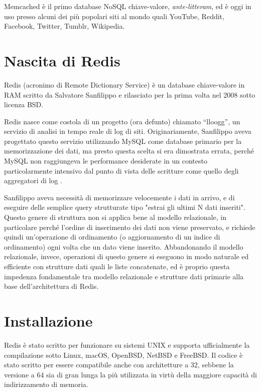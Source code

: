 Memcached è il primo database NoSQL chiave-valore, \emph{ante-litteram}, ed è oggi in uso presso alcuni
dei più popolari siti al mondo quali YouTube, Reddit, Facebook, Twitter, Tumblr, Wikipedia.


\section{Nascita di Redis}

Redis (acronimo di Remote Dictionary Service) è un database chiave-valore in RAM scritto
da Salvatore Sanfilippo e rilasciato per la prima volta nel 2008 sotto licenza BSD.

Redis nasce come costola di un progetto (ora defunto) chiamato ``lloogg'', un servizio di
analisi in tempo reale di log di siti. Originariamente, Sanfilippo aveva progettato
questo servizio utilizzando MySQL come database primario per la memorizzazione dei
dati, ma presto questa scelta si era dimostrata errata, perché MySQL non raggiungeva le
performance desiderate in un contesto particolarmente intensivo dal punto di vista delle
scritture come quello degli aggregatori di log \cite{nascita}.

Sanfilippo aveva necessità di memorizzare velocemente i dati in arrivo, e di eseguire
delle semplice query strutturate tipo "estrai gli ultimi N dati inseriti". Questo genere
di struttura non si applica bene al modello relazionale, in particolare perché l'ordine
di inserimento dei dati non viene preservato, e richiede quindi un'operazione di ordinamento
(o aggiornamento di un indice di ordinamento) ogni volta che un dato viene inserito.
Abbandonando il modello relazionale, invece, operazioni di questo genere si eseguono
in modo naturale ed efficiente con strutture dati quali le liste concatenate, ed è
proprio questa impedenza fondamentale tra modello relazionale e strutture dati primarie
alla base dell'architettura di Redis.

\section{Installazione}

Redis è stato scritto per funzionare su sistemi UNIX e supporta ufficialmente la
compilazione sotto Linux, macOS, OpenBSD, NetBSD e FreeBSD. Il codice è stato scritto
per essere compatibile anche con architetture a \SI{32}{\bit}, sebbene la versione a 
\SI{64}{\bit} sia di gran lunga la più utilizzata in virtù della maggiore capacità di 
indirizzamento di memoria.

